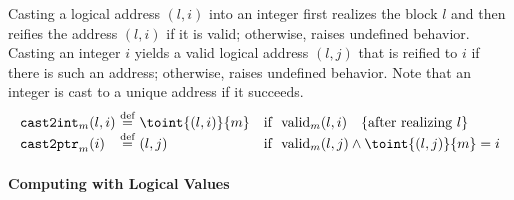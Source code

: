 Casting a logical address $(l,i)$ into an integer first realizes the
block $l$ and then reifies the address $(l,i)$ if it is valid;
otherwise, raises undefined behavior.  Casting an integer $i$ yields a
valid logical address $(l,j)$ that is reified to $i$ if there is such
an address; otherwise, raises undefined behavior. Note that 
an integer is cast to a unique address if it succeeds.
\[
\begin{array}{@{}l@{~}c@{~}ll@{}}
\code{cast2int}_m(l,i) &\defeq& \toint{(l,i)}{m} &\text{if }~ \text{valid}_m(l,i)
~~~\text{\{after realizing $l$\}}
\\
\code{cast2ptr}_m(i)   &\defeq& (l,j) & \text{if }~ \text{valid}_m(l,j) \land \toint{(l,j)}{m}=i \\
\end{array}
\]


\paragraph{Computing with Logical Values}


